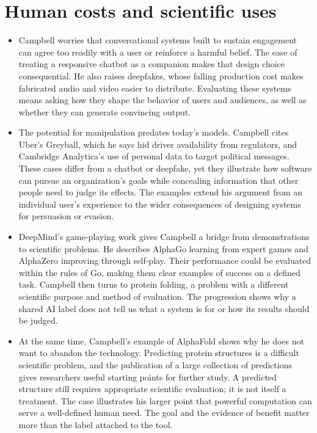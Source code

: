 \documentclass[10pt]{article}
\begin{document}
\section*{Human costs and scientific uses}

\begin{itemize}[leftmargin=1.25em, itemsep=0.3em, parsep=0pt, topsep=0pt]
    \item Campbell worries that conversational systems built to sustain engagement can agree too readily with a user or reinforce a harmful belief. The ease of treating a responsive chatbot as a companion makes that design choice consequential. He also raises deepfakes, whose falling production cost makes fabricated audio and video easier to distribute. Evaluating these systems means asking how they shape the behavior of users and audiences, as well as whether they can generate convincing output.

    \item The potential for manipulation predates today's models. Campbell cites Uber's Greyball, which he says hid driver availability from regulators, and Cambridge Analytica's use of personal data to target political messages. These cases differ from a chatbot or deepfake, yet they illustrate how software can pursue an organization's goals while concealing information that other people need to judge its effects. The examples extend his argument from an individual user's experience to the wider consequences of designing systems for persuasion or evasion.

    \item DeepMind's game-playing work gives Campbell a bridge from demonstrations to scientific problems. He describes AlphaGo learning from expert games and AlphaZero improving through self-play. Their performance could be evaluated within the rules of Go, making them clear examples of success on a defined task. Campbell then turns to protein folding, a problem with a different scientific purpose and method of evaluation. The progression shows why a shared AI label does not tell us what a system is for or how its results should be judged.

    \item At the same time, Campbell's example of AlphaFold shows why he does not want to abandon the technology. Predicting protein structures is a difficult scientific problem, and the publication of a large collection of predictions gives researchers useful starting points for further study. A predicted structure still requires appropriate scientific evaluation; it is not itself a treatment. The case illustrates his larger point that powerful computation can serve a well-defined human need. The goal and the evidence of benefit matter more than the label attached to the tool.
\end{itemize}
\end{document}
